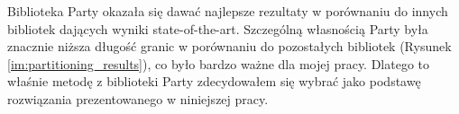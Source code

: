 Biblioteka Party \cite{1364754} okazała się dawać najlepsze rezultaty w porównaniu do innych bibliotek dających wyniki
state-of-the-art.
Szczególną własnością Party była znacznie niższa długość granic w porównaniu do pozostałych bibliotek
(Rysunek \ref{im:partitioning_results}), co było bardzo ważne dla mojej pracy.
Dlatego to właśnie metodę z biblioteki
Party zdecydowałem się wybrać jako podstawę rozwiązania prezentowanego w niniejszej pracy.